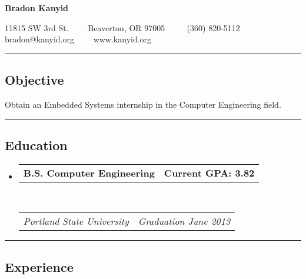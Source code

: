 \documentclass[10pt,letterpaper]{article}
\makeatletter
\newenvironment{indentsection}[1]%
{\begin{list}{}%
	{\setlength{\leftmargin}{#1}}%
	\item[]%
}
{\end{list}}
\newcommand{\headerrow}[2]
{\begin{tabular*}{\linewidth}{l@{\extracolsep{\fill}}r}
	#1 &
	#2 \\
\end{tabular*}}
\makeatother
\begin{document}
\begin{center}
{\LARGE \textbf{Bradon Kanyid}}

11815 SW 3rd St.\ \ \textbullet
\ \ Beaverton, OR 97005 \ \ \textbullet
\ \ (360) 820-5112\\
bradon@kanyid.org\ \ \textbullet
\ \ www.kanyid.org
\end{center}

\hrule
\vspace{-0.4em}
\subsection*{Objective}
\begin{indentsection}{\parindent}
\begin{description*}
	\item Obtain an Embedded Systems internship in the Computer Engineering field.
\end{description*}
\end{indentsection}
\vspace{1em}

\hrule
\vspace{-0.4em}
\subsection*{Education}

\begin{itemize}
	\parskip=0.1em

	\item 
	\headerrow
                {\textbf{B.S. Computer Engineering}}
		{\textbf{Current GPA: 3.82}}
	\\
	\headerrow
		{\emph{Portland State University}}
		{\emph{Graduation June 2013}}
\end{itemize}
\vspace{1em}

\hrule
\vspace{-0.4em}
\subsection*{Experience}
\end{document}
